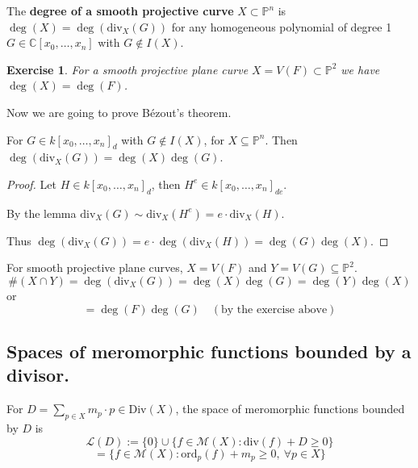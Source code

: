 \documentclass{article}
\newtheorem{exercise}{Exercise}
\begin{document}
\begin{definition}
    The \textbf{degree of a smooth projective curve} $X \subset \mathbb{P}^n$
    is $\deg(X) = \deg(\text{div}_X(G))$ for any homogeneous polynomial of degree 1 $G \in \mathbb{C}[x_0, \dots, x_n]$
    with $G \notin I(X)$.
\end{definition}

\begin{exercise}
    For a smooth projective plane curve $X = V(F) \subset \mathbb{P}^2$
    we have $\deg(X) = \deg(F)$.
\end{exercise}

Now we are going to prove Bézout's theorem.

\begin{proposition}
For $G \in k[x_0, \ldots, x_n]_d$ with $G \notin I(X)$, for $X \subseteq \mathbb{P}^n$.
Then $\deg(\mathrm{div}_X(G)) = \deg(X)\deg(G)$.
\end{proposition}

\begin{proof}
Let $H \in k[x_0, \ldots, x_n]_d$, then $H^e \in k[x_0, \ldots, x_n]_{de}$.

By the lemma $\mathrm{div}_X(G) \sim \mathrm{div}_X(H^e) = e \cdot \mathrm{div}_X(H)$.

Thus $\deg(\mathrm{div}_X(G)) = e \cdot \deg(\mathrm{div}_X(H)) = \deg(G)\deg(X)$.
\end{proof}

\begin{corollary}
For smooth projective plane curves, $X=V(F)$ and $Y=V(G) \subseteq \mathbb{P}^2$.
$$ \#(X \cap Y) = \deg(\mathrm{div}_X(G)) = \deg(X)\deg(G) = \deg(Y)\deg(X) $$
or
$$ = \deg(F)\deg(G) \quad (\text{by the exercise above}) $$
\end{corollary}

\subsection{Spaces of meromorphic functions bounded by a divisor.}

\begin{definition}
For $D = \sum_{p \in X} m_p \cdot p \in \mathrm{Div}(X)$, the space of meromorphic functions bounded by $D$ is
$$ \mathcal{L}(D) := \{0\} \cup \{ f \in \mathcal{M}(X) : \mathrm{div}(f)+D \ge 0 \} $$
$$ = \{ f \in \mathcal{M}(X) : \mathrm{ord}_p(f) + m_p \ge 0, \ \forall p \in X \} $$
\end{definition}
\end{document}
